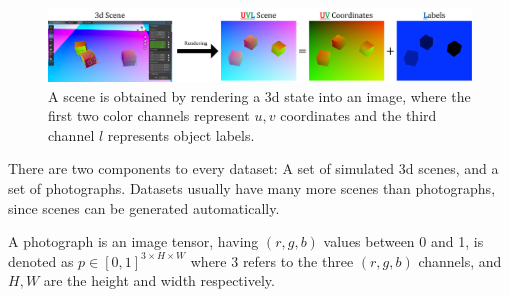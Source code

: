 \documentclass{article}
\begin{document}
	\begin{figure}[H]
		\begin{center}
			\includegraphics[width=400pt]{../images/uvl_explanation_minimal.pdf}
		\end{center}
		\caption{
			A scene is obtained by rendering a 3d state into an image, where the first two color channels represent $u,v$ coordinates and the third channel $l$ represents object labels.
			}
		\label{fig:uvl_explanation}
	\end{figure}

	There are two components to every dataset: A set of simulated 3d scenes, and a set of photographs.
	Datasets usually have many more scenes than photographs, since scenes can be generated automatically.



	A photograph is an image tensor, having $(r,g,b)$ values between 0 and 1,
		is denoted as ${p \in [0,1]^{ 3 \times H \times W}}$ where 
		3 refers to the three $(r,g,b)$ channels, 
		and $H,W$ are the height and width respectively.
\end{document}
